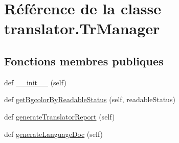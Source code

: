 \hypertarget{classtranslator_1_1_tr_manager}{}\section{Référence de la classe translator.\+Tr\+Manager}
\label{classtranslator_1_1_tr_manager}
\subsection*{Fonctions membres publiques}
\begin{DoxyCompactItemize}
\item 
def \hyperlink{classtranslator_1_1_tr_manager_af2b5c2c3fa0db925e084b057baf62041}{\+\_\+\+\_\+init\+\_\+\+\_\+} (self)
\item 
def \hyperlink{classtranslator_1_1_tr_manager_a78ac044c68bc34dae3eb194b8a53aa3b}{get\+Bgcolor\+By\+Readable\+Status} (self, readable\+Status)
\item 
def \hyperlink{classtranslator_1_1_tr_manager_a84aba0e70020862ec40a29909de43687}{generate\+Translator\+Report} (self)
\item 
def \hyperlink{classtranslator_1_1_tr_manager_a61f10f267ebea913b1533ad9ad786753}{generate\+Language\+Doc} (self)
\end{DoxyCompactItemize}
